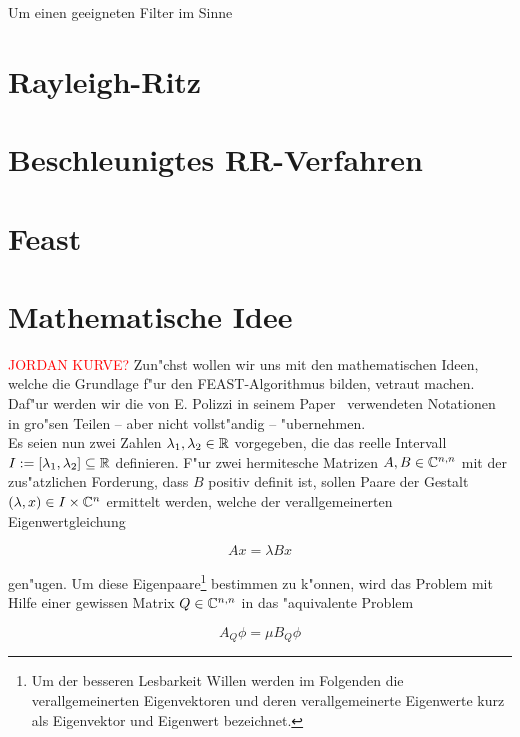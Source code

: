 Um einen geeigneten Filter im Sinne

\section{Rayleigh-Ritz}

\section{Beschleunigtes RR-Verfahren}

\section{Feast}


\section{Mathematische Idee} \label{sec:math}%
\textcolor{red}{JORDAN KURVE?}
Zun"chst wollen wir uns mit den mathematischen Ideen, welche die
Grundlage f"ur den \textsc{FEAST}-Algorithmus bilden, vetraut machen. Daf"ur werden wir
die von E. Polizzi in seinem Paper~\cite{polizzi} verwendeten Notationen in gro"sen
Teilen -- aber nicht vollst"andig -- "ubernehmen.\\

Es seien nun zwei  Zahlen $\lambda_1, \lambda_2 \in \mathbb{R}$ vorgegeben, die
das reelle Intervall $I:=[\lambda_1, \lambda_2] \subseteq \mathbb{R}$ definieren.
F"ur zwei hermitesche Matrizen $A, B \in \mathbb{C}^{n,n}$ mit der zus"atzlichen
Forderung, dass $B$ positiv definit ist, sollen Paare der Gestalt
$(\lambda, x) \in I \times \mathbb{C}^n$ ermittelt werden, welche der verallgemeinerten
Eigenwertgleichung

  \begin{equation}\label{eq:eigen} %
  Ax = \lambda Bx
  \end{equation}

gen"ugen. Um diese Eigenpaare\footnote{Um der besseren Lesbarkeit Willen werden
im Folgenden die verallgemeinerten Eigenvektoren und deren verallgemeinerte
Eigenwerte kurz als Eigenvektor und Eigenwert bezeichnet.}
bestimmen zu k"onnen, wird das Problem mit Hilfe einer
gewissen Matrix $Q\in\mathbb{C}^{n,n}$ in das "aquivalente Problem

  \begin{equation}\label{eq:Qeigen}
  A_Q \phi = \mu B_Q \phi
  \end{equation}

